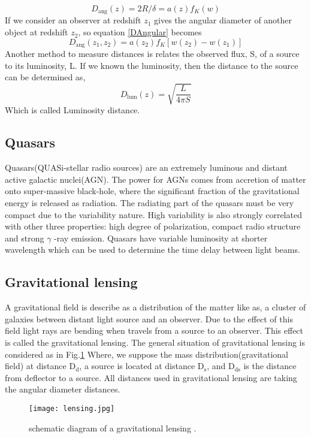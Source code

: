 \begin{equation}
D_\text{ang}(z)=2R/\delta=a(z)f_{K}(w)
\label{DAngular}
\end{equation}
\noindent
If we consider an observer at redshift $ z_{1} $ gives the angular diameter of another object at redshift $ z_{2} $, so equation \ref{DAngular} becomes
\begin{equation}
D_\text{ang}(z_{1},z_{2})=a(z_{2})f_{K}[w(z_{2}) - w(z_{1})]
\label{math:Dangular2}
\end{equation}
Another method to measure distances is relates the observed flux, S, of a source to its luminosity, L. If we known the luminosity, then the distance to the source can be determined as,
\begin{equation}
D_\text{lum}(z)=\sqrt{\frac{L}{4\pi S}}
\end{equation}
Which is called Luminosity distance.

\subsection{Quasars}
Quasars(QUASi-stellar radio sources) are an extremely luminous and distant active galactic nuclei(AGN). The power for AGNs comes from accretion of matter onto super-massive black-hole, where the significant fraction of the gravitational energy is released as radiation. The radiating part of the quasars must be very compact due to the variability nature. High variability is also strongly correlated with other three properties: high degree of polarization, compact radio structure and strong $ \gamma $ -ray emission\cite{manual}. Quasars have variable luminosity at shorter wavelength which can be used to determine the time delay between light beams.

\subsection{Gravitational lensing}
A gravitational field is describe as a distribution of the matter like as, a cluster of galaxies between distant light source and an observer. Due to the effect of this field light rays are bending when travels from a source to an observer. This effect is called the gravitational lensing. The general situation of gravitational lensing is considered as in Fig.\ref{Fig:lensing} Where, we suppose the mass distribution(gravitational field) at distance $ \text{D}_{\text{d}}$, a source is located at distance $ \text{D}_{\text{s}} $, and $ \text{D}_{\text{ds}}$ is the distance from deflector to a source. All distances used in gravitational lensing are taking the angular diameter distances.
\begin{figure}[H]
	\centering
	\texttt{[image: lensing.jpg]}
	\caption{schematic diagram of a gravitational lensing \cite{manual}.}%
	\label{Fig:lensing}
\end{figure}


